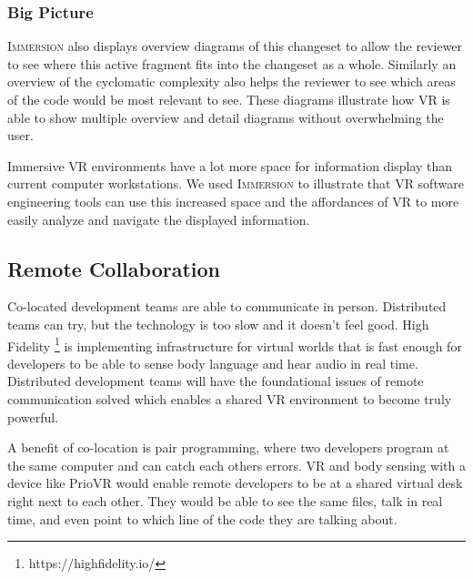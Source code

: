 \documentclass[conference]{IEEEtran}
\begin{document}
\subsubsection{Big Picture}
\textsc{Immersion} also displays overview diagrams of this changeset to allow the reviewer to see where this active fragment fits into the changeset as a whole. 
Similarly an overview of the cyclomatic complexity also helps the reviewer to see which areas of the code would be most relevant to see. 
These diagrams illustrate how VR is able to show multiple overview and detail diagrams without overwhelming the user.

Immersive VR environments have a lot more space for information display than current computer workstations.
We used \textsc{Immersion} to illustrate that VR software engineering tools can use this increased space and the affordances of VR to more easily analyze and navigate the displayed information.

\subsection{Remote Collaboration}


Co-located development teams are able to communicate in person. 
Distributed teams can try, but the technology is too slow and it doesn't feel good. 
High Fidelity \footnote{https://highfidelity.io/} is implementing infrastructure for virtual worlds that is fast enough for developers to be able to sense body language and hear audio in real time.  
Distributed development teams will have the foundational issues of remote communication solved which enables a shared VR environment to become truly powerful.

A benefit of co-location is pair programming, where two developers program at the same computer and can catch each others errors. 
VR and body sensing with a device like PrioVR would enable remote developers to be at a shared virtual desk right next to each other. 
They would be able to see the same files, talk in real time, and even point to which line of the code they are talking about. 
\end{document}
